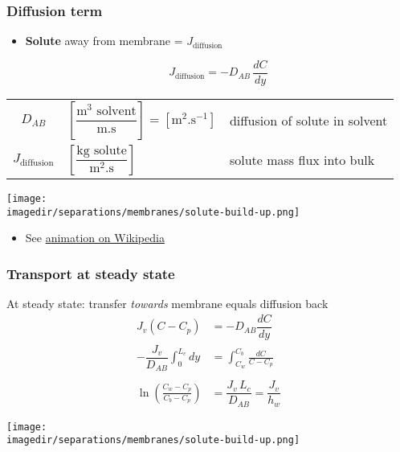 \begin{frame}\frametitle{Diffusion term}
	\begin{itemize}
		\item	\textbf{Solute} {\color{purple}{diffusion}} away from membrane = $J_\text{diffusion}$
		\begin{exampleblock}{}
			\[
				J_\text{diffusion} = -D_{AB} \,\frac{dC}{dy}
			\]
		\end{exampleblock}
	\end{itemize}

	\begin{tabular}{cll}
		$D_{AB}$				&	$\left[\dfrac{\text{m}^3 \text{~solvent}}{\text{m.s}}\right] = \left[\text{m}^2\text{.s}^{-1}\right]$	& diffusion of solute in solvent \\
		$J_\text{diffusion}$ 	&  	$\left[\dfrac{\text{kg solute}}{\text{m}^2 \text{.s}}\right]$	& solute mass flux into bulk\\
	\end{tabular}
	\begin{center}
		\texttt{[image: \\imagedir/separations/membranes/solute-build-up.png]}
	\end{center}
	\vspace{-6pt}
	\begin{itemize}
		\item	See \href{http://en.wikipedia.org/wiki/File:DiffusionMicroMacro.gif}{animation on Wikipedia}
	\end{itemize}
\end{frame}

\begin{frame}\frametitle{Transport at steady state}
	At steady state: transfer \emph{\color{myOrange}towards} membrane equals diffusion back
	\[
		\begin{array}{rl}
		 	J_v(C - C_p)  &= -D_{AB} \dfrac{dC}{dy} \\
			-\dfrac{J_v}{D_{AB}} \displaystyle \int_{0}^{L_c}{dy} &= \displaystyle \int_{C_w}^{C_b}{\frac{dC}{C-C_p}} \\ \\
			\displaystyle\ln\left(\frac{C_w - C_p}{C_b - C_p}\right) &= \dfrac{J_v \,L_c}{D_{AB}} = \dfrac{J_v}{h_w}
		\end{array}
	\]
	\vspace{6pt}
	\begin{center}
		\texttt{[image: \\imagedir/separations/membranes/solute-build-up.png]}
	\end{center}
\end{frame}

